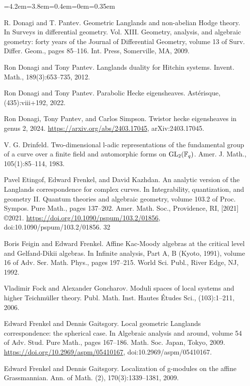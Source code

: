 \begin{list}{}{\leftmargin=4.2em=3.8em=0.4em\itemindent=0em\parsep=0.35em}
\item[{DP09}] R. Donagi and T. Pantev. Geometric Langlands and non-abelian Hodge theory. In Surveys in differential geometry. Vol. XIII. Geometry, analysis, and algebraic geometry: forty years of the Journal of Differential Geometry, volume 13 of Surv. Differ. Geom., pages 85–116. Int. Press, Somerville, MA, 2009.
\item[{DP12}] Ron Donagi and Tony Pantev. Langlands duality for Hitchin systems. Invent. Math., 189(3):653–735, 2012.
\item[{DP22}] Ron Donagi and Tony Pantev. Parabolic Hecke eigensheaves. Astérisque, (435):viii+192, 2022.
\item[{DPS24}] Ron Donagi, Tony Pantev, and Carlos Simpson. Twistor hecke eigensheaves in genus 2, 2024. \url{https://arxiv.org/abs/2403.17045}, arXiv:2403.17045.
\item[{Dri83}] V. G. Drinfeld. Two-dimensional l-adic representations of the fundamental group of a curve over a finite field and automorphic forms on $\mathrm{GL}_{2}(\mathbb{F}_{q})$. Amer. J. Math., 105(1):85–114, 1983.
\item[{EFK21}] Pavel Etingof, Edward Frenkel, and David Kazhdan. An analytic version of the Langlands correspondence for complex curves. In Integrability, quantization, and geometry II. Quantum theories and algebraic geometry, volume 103.2 of Proc. Sympos. Pure Math., pages 137–202. Amer. Math. Soc., Providence, RI, [2021] ©2021. \url{https://doi.org/10.1090/pspum/103.2/01856}, doi:10.1090/pspum/103.2/01856. 32
\item[{FF92}] Boris Feigin and Edward Frenkel. Affine Kac-Moody algebras at the critical level and Gelfand-Dikii algebras. In Infinite analysis, Part A, B (Kyoto, 1991), volume 16 of Adv. Ser. Math. Phys., pages 197–215. World Sci. Publ., River Edge, NJ, 1992.
\item[{FG06}] Vladimir Fock and Alexander Goncharov. Moduli spaces of local systems and higher Teichmüller theory. Publ. Math. Inst. Hautes Études Sci., (103):1–211, 2006.
\item[{FG09a}] Edward Frenkel and Dennis Gaitsgory. Local geometric Langlands correspondence: the spherical case. In Algebraic analysis and around, volume 54 of Adv. Stud. Pure Math., pages 167–186. Math. Soc. Japan, Tokyo, 2009. \url{https://doi.org/10.2969/aspm/05410167}, doi:10.2969/aspm/05410167.
\item[{FG09b}] Edward Frenkel and Dennis Gaitsgory. Localization of g-modules on the affine Grassmannian. Ann. of Math. (2), 170(3):1339–1381, 2009.

\end{list}
